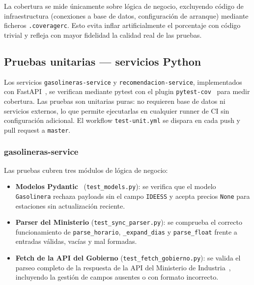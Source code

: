 La cobertura se mide únicamente sobre lógica de negocio, excluyendo código de infraestructura
(conexiones a base de datos, configuración de arranque) mediante ficheros \texttt{.coveragerc}.
Esto evita inflar artificialmente el porcentaje con código trivial y refleja con mayor fidelidad
la calidad real de las pruebas.

\subsection{Pruebas unitarias — servicios Python}
\label{sec:pruebas-unitarias-python}

Los servicios \texttt{gasolineras-service} y \texttt{recomendacion-service}, implementados con
FastAPI~\cite{fastapi}, se verifican mediante pytest con el plugin \texttt{pytest-cov}~\cite{pytest_cov}
para medir cobertura. Las pruebas son unitarias puras: no requieren base de datos ni servicios
externos, lo que permite ejecutarlas en cualquier runner de CI sin configuración adicional.
El workflow \texttt{test-unit.yml} se dispara en cada push y pull request a \texttt{master}.

\subsubsection{gasolineras-service}

Las pruebas cubren tres módulos de lógica de negocio:

\begin{itemize}
  \item \textbf{Modelos Pydantic}~\cite{pydantic} (\texttt{test\_models.py}): se verifica que
        el modelo \texttt{Gasolinera} rechaza payloads sin el campo \texttt{IDEESS} y acepta
        precios \texttt{None} para estaciones sin actualización reciente.

  \item \textbf{Parser del Ministerio} (\texttt{test\_sync\_parser.py}): se comprueba el
        correcto funcionamiento de \texttt{parse\_horario}, \texttt{\_expand\_dias} y
        \texttt{parse\_float} frente a entradas válidas, vacías y mal formadas.

  \item \textbf{Fetch de la API del Gobierno} (\texttt{test\_fetch\_gobierno.py}): se valida
        el parseo completo de la respuesta de la API del Ministerio de Industria~\cite{datosgob_carburantes},
        incluyendo la gestión de campos ausentes o con formato incorrecto.
\end{itemize}

